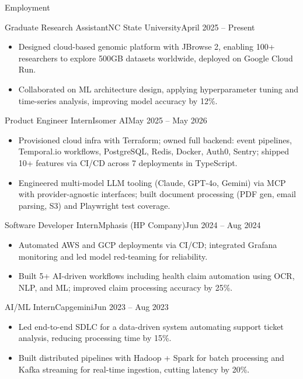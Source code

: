 \documentclass[]{mcdowellcv}
\begin{document}
\makeheader

\begin{cvsection}{Employment}
  \begin{cvsubsection}{Graduate Research Assistant}{NC State University}{April 2025 -- Present}
    \begin{itemize}
      \item Designed cloud-based genomic platform with JBrowse 2, enabling 100+ researchers to explore 500GB datasets worldwide, deployed on Google Cloud Run.
      \item Collaborated on ML architecture design, applying hyperparameter tuning and time-series analysis, improving model accuracy by 12\%.
    \end{itemize}
    \vspace{-1.5pt}
  \end{cvsubsection}

  \begin{cvsubsection}{Product Engineer Intern}{Isomer AI}{May 2025 -- May 2026}
    \begin{itemize}
      \item Provisioned cloud infra with Terraform; owned full backend: event pipelines, Temporal.io workflows, PostgreSQL, Redis, Docker, Auth0, Sentry; shipped 10+ features via CI/CD across 7 deployments in TypeScript.
      \item Engineered multi-model LLM tooling (Claude, GPT-4o, Gemini) via MCP with provider-agnostic interfaces; built document processing (PDF gen, email parsing, S3) and Playwright test coverage.
    \end{itemize}
    \vspace{-1.5pt}
  \end{cvsubsection}

  \begin{cvsubsection}{Software Developer Intern}{Mphasis (HP Company)}{Jun 2024 -- Aug 2024}
    \begin{itemize}
      \item Automated AWS and GCP deployments via CI/CD; integrated Grafana monitoring and led model red-teaming for reliability.
      \item Built 5+ AI-driven workflows including health claim automation using OCR, NLP, and ML; improved claim processing accuracy by 25\%.
    \end{itemize}
    \vspace{-1.5pt}
  \end{cvsubsection}

  \begin{cvsubsection}{AI/ML Intern}{Capgemini}{Jun 2023 -- Aug 2023}
    \begin{itemize}
      \item Led end-to-end SDLC for a data-driven system automating support ticket analysis, reducing processing time by 15\%.
      \item Built distributed pipelines with Hadoop + Spark for batch processing and Kafka streaming for real-time ingestion, cutting latency by 20\%.
    \end{itemize}
    \vspace{-1.5pt}
  \end{cvsubsection}
\end{cvsection}
\end{document}
